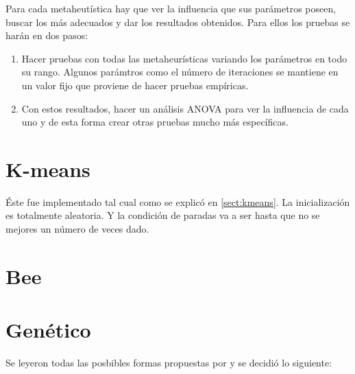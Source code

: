 Para cada metaheut\'istica hay que ver la influencia que sus par\'ametros 
poseen, buscar los m\'as adecuados y dar los resultados obtenidos.
Para ellos los pruebas se har\'an en dos pasos:

\begin{enumerate}

\item Hacer pruebas con todas las metaheur\'isticas variando los par\'ametros 
en todo su rango. Algunos par\'amtros como el n\'umero de iteraciones se mantiene
en un valor fijo que proviene de hacer pruebas emp\'iricas.

\item Con estos resultados, hacer un an\'alisis ANOVA para ver la influencia de cada
uno y de esta forma crear otras pruebas mucho m\'as espec\'ificas.

\end{enumerate}

\section{K-means}  \label{chap:ikmeans}

\'Este fue implementado tal cual como se explic\'o en \ref{sect:kmeans}. La
inicializaci\'on es totalmente aleatoria. Y la condici\'on de paradas
va a ser hasta que no se mejores un n\'umero de veces dado.

\section{Bee}  \label{chap:ibee}

\section{Gen\'etico}  \label{chap:igenetico}

Se leyeron todas las posbibles formas propuestas por \cite{HrCaFr2009} y se decidi\'o
lo siguiente:

